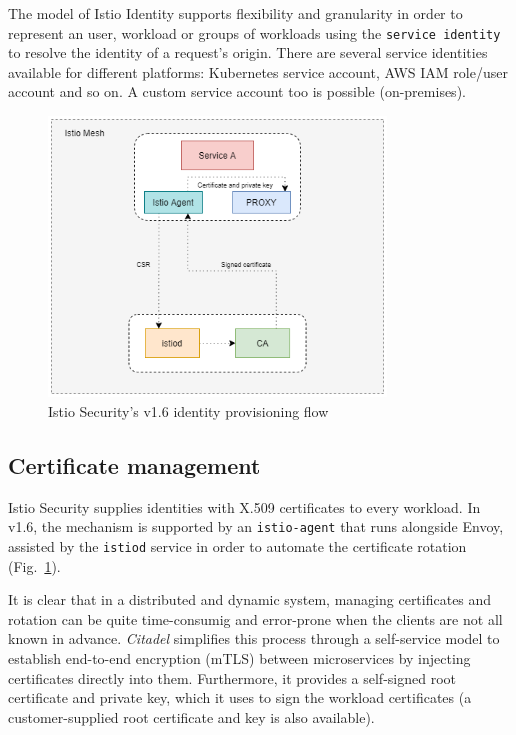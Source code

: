 The model of Istio Identity supports flexibility and granularity in order to represent an user, workload or groups of workloads using the \texttt{service identity} to resolve the identity of a request's origin.
There are several service identities available for different platforms: Kubernetes service account, AWS IAM role/user account and so on. A custom service account too is possible (on-premises).
\vspace{0.5cm}

\begin{figure}[ht]
    \centering
    \includegraphics[width=0.8\textwidth]{chapters/images/chp1/cert-prov.png}
    \caption{Istio Security's v1.6 identity provisioning flow}
    \label{fig:idprov}
\end{figure}

\subsection{Certificate management}
Istio Security supplies identities with X.509 certificates to every workload. In v1.6, the mechanism is supported by an \texttt{istio-agent} that runs alongside Envoy, assisted by the \texttt{istiod} service in order to automate the certificate rotation (Fig.~\ref{fig:idprov}).

It is clear that in a distributed and dynamic system, managing certificates and rotation can be quite time-consumig and error-prone when the clients are not all known in advance. \textit{Citadel} simplifies this process through a self-service model to establish end-to-end encryption (mTLS) between microservices by injecting certificates directly into them. Furthermore, it provides a self-signed root certificate and private key, which it uses to sign the workload certificates (a customer-supplied root certificate and key is also available).

